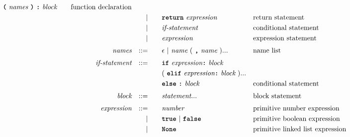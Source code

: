 \begin{alignat*}{9}
                                   \textbf{\texttt{(}}\  \textit{names} \ \textbf{\texttt{)}}\ \textbf{\texttt{:}}\ \textit{block} \quad
                                                           && \textrm{function declaration}\\
&&                       && |   &\quad && \textbf{\texttt{return}}\  \textit{expression}
                                                           && \textrm{return statement}\\
&&                       && |   &\quad && \textit{if-statement} \quad
                                                           && \textrm{conditional statement}\\
&&                       && |   &\quad &&  \textit{expression}
                                                           && \textrm{expression statement} \\[1mm]
&& \textit{names}   && ::= &\quad &&  \epsilon\ | \  \textit{name} \ 
                                                   (\ \textbf{\texttt{,}} \ \textit{name}\ ) ...
                                                            && \textrm{name list}   \\[1mm]
&& \textit{if-statement} && ::= &\quad && \textbf{\texttt{if}} \ \textit{expression} \textbf{\texttt{:}} \ \textit{block} \\
&&                       &&     &      && (\ \textbf{\texttt{elif}} \ \textit{expression} \textbf{\texttt{:}} \ \textit{block}\ )... \\
&&                       &&     &      && \textbf{\texttt{else}}\ \textbf{\texttt{:}} \ \textit{block} 
                                                            && \textrm{conditional statement}   \\[1mm]
&& \textit{block}        && ::= &      && \textit{statement}... \quad
                                                           && \textrm{block statement}\\[1mm]         
&& \textit{expression}   && ::= &\quad &&  \textit{number}   && \textrm{primitive number expression}\\
&&                       && |   &\quad && \textbf{\texttt{true}}\ |\ \textbf{\texttt{false}}
                                                           && \textrm{primitive boolean expression}\\
&&                       && |   &\quad &&  \textbf{\texttt{None}} && \textrm{primitive linked list expression}\\

\end{alignat*}

